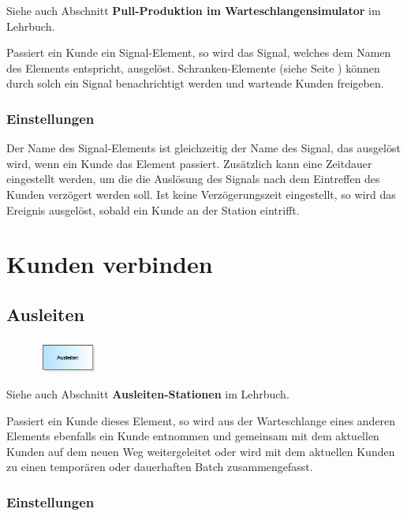 Siehe auch Abschnitt \textbf{Pull-Produktion im Warteschlangensimulator} im Lehrbuch.

Passiert ein Kunde ein Signal-Element, so wird das Signal, welches dem Namen des Elements entspricht, ausgelöst.
Schranken-Elemente (siehe Seite \pageref{ref:ModelElementBarrier}) können durch solch ein Signal benachrichtigt werden und
wartende Kunden freigeben.

\subsection*{Einstellungen}

Der Name des Signal-Elements ist gleichzeitig der Name des Signal, das ausgelöst wird, wenn ein Kunde das Element passiert.
Zusätzlich kann eine Zeitdauer eingestellt werden, um die die Auslösung des Signals nach dem Eintreffen des Kunden verzögert werden soll.
Ist keine Verzögerungszeit eingestellt, so wird das Ereignis ausgelöst, sobald ein Kunde an der Station eintrifft.





\chapter{Kunden verbinden}

\section{Ausleiten}
\label{ref:ModelElementPickUp}

\begin{figure}
\vspace{-22pt}
\includegraphics[width=2cm]{imageModelElementPickUp.png}
\vspace{-22pt}
\end{figure}

Siehe auch Abschnitt \textbf{Ausleiten-Stationen} im Lehrbuch.

Passiert ein Kunde dieses Element, so wird aus der Warteschlange eines anderen Elements ebenfalls ein Kunde entnommen
und gemeinsam mit dem aktuellen Kunden auf dem neuen Weg weitergeleitet oder wird mit dem aktuellen Kunden
zu einen temporären oder dauerhaften Batch zusammengefasst.

\subsection*{Einstellungen}

